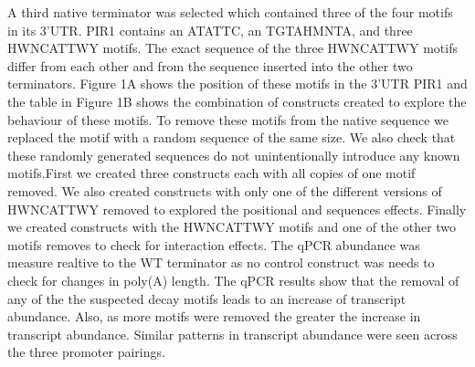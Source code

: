 \documentclass{SBCbookchapter}
\begin{document}
A third native terminator was selected which contained three of the four motifs in its 3'UTR. PIR1 contains an ATATTC, an TGTAHMNTA, and three HWNCATTWY motifs. The exact sequence of the three HWNCATTWY motifs differ from each other and from the sequence inserted into the other two terminators. Figure 1A shows the position of these motifs in the 3'UTR PIR1 and the table in Figure 1B shows the combination of constructs created to explore the behaviour of these motifs. To remove these motifs from the native sequence we replaced the motif with a random sequence of the same size. We also check that these randomly generated sequences do not unintentionally introduce any known motifs.First we created three constructs each with all copies of one motif removed. We also created constructs with only one of the different versions of HWNCATTWY removed to explored the positional and sequences effects. Finally we created constructs with the HWNCATTWY motifs and one of the other two motifs removes to check for interaction effects. The qPCR abundance was measure realtive to the WT terminator as no control construct was needs to check for changes in poly(A) length. The qPCR results show that the removal of any of the the suspected decay motifs leads to an increase of transcript abundance. Also, as more motifs were removed the greater the increase in transcript abundance. Similar patterns in transcript abundance were seen across the three promoter pairings. 
\end{document}

